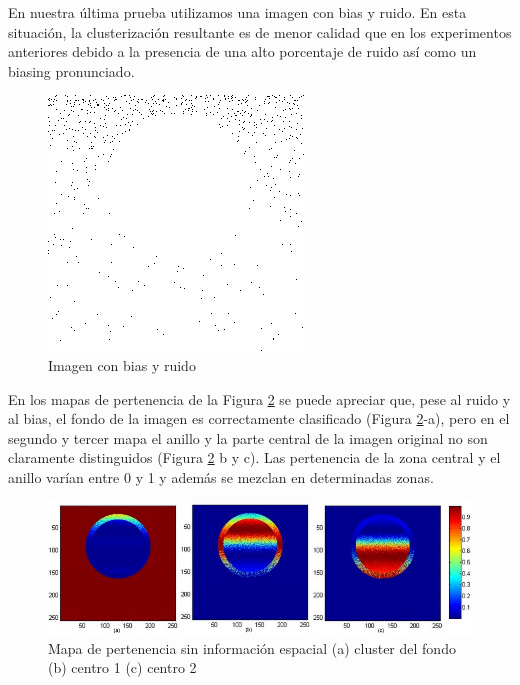 En nuestra última prueba utilizamos una imagen con bias y ruido. En esta situación, la clusterización resultante es de menor calidad que en los experimentos anteriores debido a la presencia de una alto porcentaje de ruido así como un biasing pronunciado. 

\begin{figure}[H]
\centering
\includegraphics[scale=0.3]{images/biasing_con_ruido.png}
\caption{Imagen con bias y ruido}
\label{fig:circulo_bias_ruido}
\end{figure}

En los mapas de pertenencia de la Figura \ref{fig:circulo_bias_ruido_cluster} se puede apreciar que, pese al ruido y al bias, el fondo de la imagen es correctamente clasificado (Figura \ref{fig:circulo_bias_ruido_cluster}-a), pero en el segundo y tercer mapa el anillo y la parte central de la imagen original no son claramente distinguidos (Figura \ref{fig:circulo_bias_ruido_cluster} b y c). Las pertenencia de la zona central y el anillo varían entre 0 y 1 y además se mezclan en determinadas zonas.

\begin{figure}[H]
\centering
\includegraphics[scale=0.3]{images/bias_sin_coord_con_ruido.jpg}
\caption{Mapa de pertenencia sin información espacial (a) cluster del  fondo (b) centro 1 (c) centro 2}
\label{fig:circulo_bias_ruido_cluster}
\end{figure}


